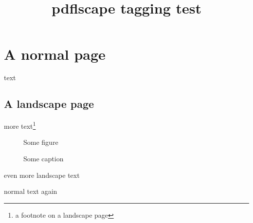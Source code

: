 \documentclass{article}
\title{pdflscape tagging test}
\begin{document}
\section{A normal page}
text

\begin{landscape}
\section{A landscape page}
more text\footnote{a footnote on a landscape page}
\begin{figure}
\centering
Some figure
\caption{Some caption}
\end{figure}

\newpage

even more landscape text
\end{landscape}

normal text again
\end{document}
